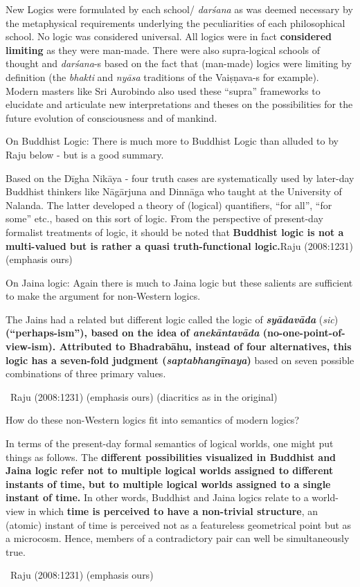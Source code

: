 New Logics were formulated by each school/ \textit{darśana} as was deemed necessary by the metaphysical requirements underlying the peculiarities of each philosophical school. No logic was considered universal. All logics were in fact \textbf{considered limiting} as they were man-made. There were also supra-logical schools of thought and \textit{darśana}-s based on the fact that (man-made) logics were limiting by definition (the \textit{bhakti} and \textit{nyāsa} traditions of the Vaiṣṇava-s for example). Modern masters like Sri Aurobindo also used these “supra” frameworks to elucidate and articulate new interpretations and theses on the possibilities for the future evolution of consciousness and of mankind.

On Buddhist Logic: There is much more to Buddhist Logic than alluded to by Raju below - but is a good summary.

\begin{myquote}
Based on the Dīgha Nikāya - four truth cases are systematically used by later-day Buddhist thinkers like Nāgārjuna and Dinnāga who taught at the University of Nalanda. The latter developed a theory of (logical) quantifiers, “for all”, “for some” etc., based on this sort of logic. From the perspective of present-day formalist treatments of logic, it should be noted that \textbf{Buddhist logic is not a multi-valued but is rather a quasi truth-functional logic.}\hfill Raju (2008:1231) (emphasis ours)
\end{myquote}

On Jaina logic: Again there is much to Jaina logic but these salients are sufficient to make the argument for non-Western logics.

\begin{myquote}
The Jains had a related but different logic called the logic of \textbf{\textit{syādavāda}} (\textit{sic}) \textbf{(“perhaps-ism”), based on the idea of \textit{anekāntavāda} (no-one-point-of-view-ism). Attributed to Bhadrabāhu, instead of four alternatives, this logic has a seven-fold judgment (\textit{saptabhangīnaya})} based on seven possible combinations of three primary values.

~\hfill Raju (2008:1231) (emphasis ours) (diacritics as in the original)
\end{myquote}

How do these non-Western logics fit into semantics of modern logics?

\begin{myquote}
In terms of the present-day formal semantics of logical worlds, one might put things as follows. The \textbf{different possibilities visualized in Buddhist and Jaina logic refer not to multiple logical worlds assigned to different instants of time, but to multiple logical worlds assigned to a single instant of time.} In other words, Buddhist and Jaina logics relate to a world-view in which \textbf{time is perceived to have a non-trivial structure}, an (atomic) instant of time is perceived not as a featureless geometrical point but as a microcosm. Hence, members of a contradictory pair can well be simultaneously true.

~\hfill Raju (2008:1231) (emphasis ours)
\end{myquote}

